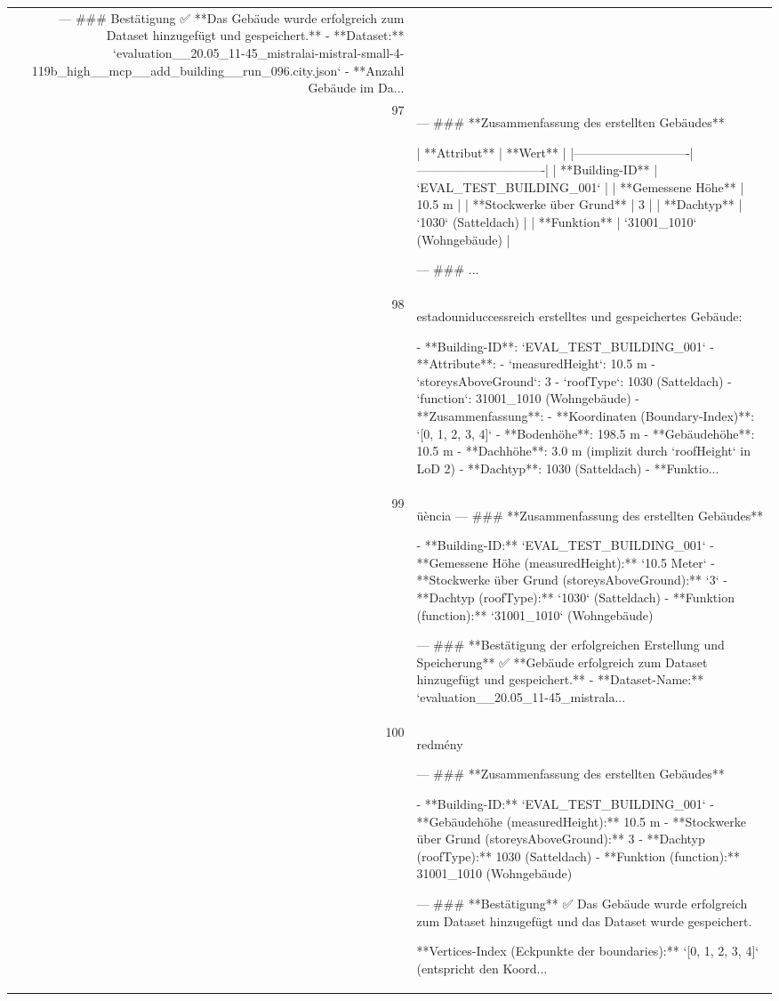\documentclass[a4paper,11pt]{article}
\begin{document}
\begin{table}[ht]
\begin{tabular}{r p{12cm}}
---
\#\#\# Bestätigung
✅ **Das Gebäude wurde erfolgreich zum Dataset hinzugefügt und gespeichert.**
- **Dataset:** `evaluation\_\_20.05\_11-45\_mistralai-mistral-small-4-119b\_high\_\_mcp\_\_add\_building\_\_run\_096.city.json`
- **Anzahl Gebäude im Da... \\
97 & ---
\#\#\# **Zusammenfassung des erstellten Gebäudes**

| **Attribut**               | **Wert**                     |
|----------------------------|-------------------------------|
| **Building-ID**            | `EVAL\_TEST\_BUILDING\_001`      |
| **Gemessene Höhe**         | 10.5 m                        |
| **Stockwerke über Grund**    | 3                             |
| **Dachtyp**               | `1030` (Satteldach)          |
| **Funktion**              | `31001\_1010` (Wohngebäude)   |

---
\#\#\# ... \\
98 &  estadouniduccessreich erstelltes und gespeichertes Gebäude:

- **Building-ID**: `EVAL\_TEST\_BUILDING\_001`
- **Attribute**:
  - `measuredHeight`: 10.5 m
  - `storeysAboveGround`: 3
  - `roofType`: 1030 (Satteldach)
  - `function`: 31001\_1010 (Wohngebäude)
- **Zusammenfassung**:
  - **Koordinaten (Boundary-Index)**: `[0, 1, 2, 3, 4]`
  - **Bodenhöhe**: 198.5 m
  - **Gebäudehöhe**: 10.5 m
  - **Dachhöhe**: 3.0 m (implizit durch `roofHeight` in LoD 2)
  - **Dachtyp**: 1030 (Satteldach)
  - **Funktio... \\
99 & üència
---
\#\#\# **Zusammenfassung des erstellten Gebäudes**

- **Building-ID:** `EVAL\_TEST\_BUILDING\_001`
- **Gemessene Höhe (measuredHeight):** `10.5 Meter`
- **Stockwerke über Grund (storeysAboveGround):** `3`
- **Dachtyp (roofType):** `1030` (Satteldach)
- **Funktion (function):** `31001\_1010` (Wohngebäude)

---
\#\#\# **Bestätigung der erfolgreichen Erstellung und Speicherung**
✅ **Gebäude erfolgreich zum Dataset hinzugefügt und gespeichert.**
- **Dataset-Name:** `evaluation\_\_20.05\_11-45\_mistrala... \\
100 & redmény

---
\#\#\# **Zusammenfassung des erstellten Gebäudes**

- **Building-ID:** `EVAL\_TEST\_BUILDING\_001`
- **Gebäudehöhe (measuredHeight):** 10.5 m
- **Stockwerke über Grund (storeysAboveGround):** 3
- **Dachtyp (roofType):** 1030 (Satteldach)
- **Funktion (function):** 31001\_1010 (Wohngebäude)

---
\#\#\# **Bestätigung**
✅ Das Gebäude wurde erfolgreich zum Dataset hinzugefügt und das Dataset wurde gespeichert.

**Vertices-Index (Eckpunkte der boundaries):**
`[0, 1, 2, 3, 4]` (entspricht den Koord... \\
\hline
\end{tabular}
\end{table}

\clearpage
\end{document}
